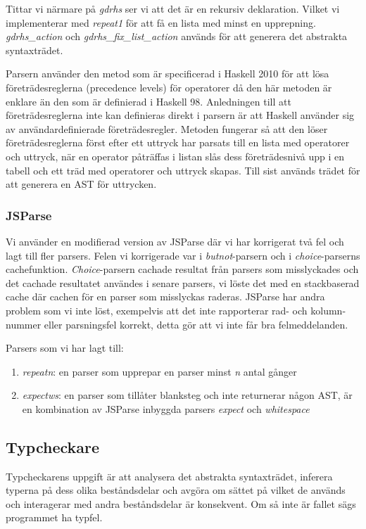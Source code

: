 Tittar vi närmare på \emph{gdrhs} ser vi att det är en rekursiv deklaration. Vilket vi implementerar med \emph{repeat1} för att få en lista med minst en upprepning. 
\emph{gdrhs\_action} och \emph{gdrhs\_fix\_list\_action} används för att generera det abstrakta syntaxträdet.

Parsern använder den metod som är specificerad i Haskell 2010 \citep{haskell2010} för att lösa företrädesreglerna (precedence levels) för operatorer då den här metoden är enklare än den som är definierad i Haskell 98. 
Anledningen till att företrädesreglerna inte kan definieras direkt i parsern är att Haskell använder sig av användardefinierade företrädesregler.
Metoden fungerar så att den löser företrädesreglerna först efter ett uttryck har parsats till en lista med operatorer 
och uttryck, när en operator påträffas i listan slås dess företrädesnivå upp i en tabell och ett träd med 
operatorer och uttryck skapas. Till sist används trädet för att generera en AST för uttrycken.

\subsubsection{JSParse}
Vi använder en modifierad version av JSParse där vi har korrigerat två fel och lagt till fler parsers. Felen vi korrigerade var i \emph{butnot}-parsern och i \emph{choice}-parserns cachefunktion. 
\emph{Choice}-parsern cachade resultat från parsers som misslyckades och det cachade resultatet användes i senare parsers, 
vi löste det med en stackbaserad cache där cachen för en parser som misslyckas raderas. 
JSParse har andra problem som vi inte löst, exempelvis att det inte rapporterar rad- och kolumn-nummer eller parsningsfel korrekt, detta gör att vi inte får bra felmeddelanden.

Parsers som vi har lagt till:
\begin{enumerate}
    \item{\emph{repeatn}: en parser som upprepar en parser minst \emph{n} antal gånger}
    \item{\emph{expectws}: en parser som tillåter blanksteg och inte returnerar någon AST, är en kombination av JSParse inbyggda parsers \emph{expect} och \emph{whitespace}}
\end{enumerate}

\subsection{Typcheckare} 
Typcheckarens uppgift är att analysera det abstrakta syntaxträdet, inferera typerna på dess olika
beståndsdelar och avgöra om sättet på vilket de används och interagerar med
andra beståndsdelar är konsekvent. Om så inte är fallet sägs programmet ha
typfel.

